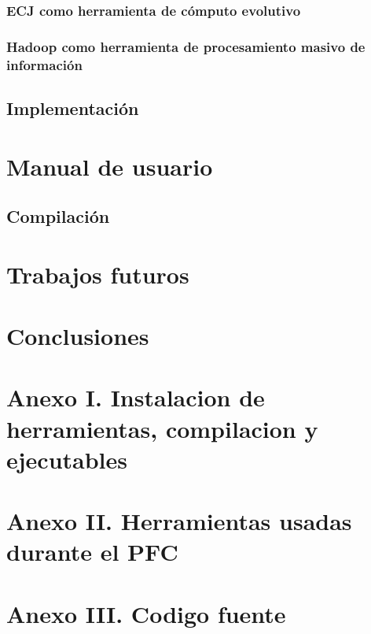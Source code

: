 \documentclass{memoriaPFC}
\begin{document}
		\subsection{ECJ como herramienta de c\'omputo evolutivo}
		\subsection{Hadoop como herramienta de procesamiento masivo de informaci\'on}
	\section{Implementaci\'on}

\chapter{Manual de usuario}
	\section{Compilaci\'on}
		

\chapter{Trabajos futuros}

\chapter{Conclusiones}

\chapter{Anexo I. Instalacion de herramientas, compilacion y ejecutables}

\chapter{Anexo II. Herramientas usadas durante el PFC}

\chapter{Anexo III. Codigo fuente}

\end{document}
